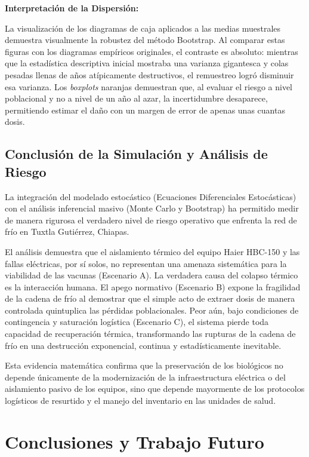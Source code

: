 \documentclass[
  spanish,
  us-letterpaper,
]{scrreprt}
\numberwithin{equation}{section}
\theoremstyle{plain}
\theoremstyle{plain}
\theoremstyle{plain}
\theoremstyle{definition}
\theoremstyle{remark}
\begin{document}
\textbf{Interpretación de la Dispersión:}

La visualización de los diagramas de caja aplicados a las medias
muestrales demuestra visualmente la robustez del método Bootstrap. Al
comparar estas figuras con los diagramas empíricos originales, el
contraste es absoluto: mientras que la estadística descriptiva inicial
mostraba una varianza gigantesca y colas pesadas llenas de años
atípicamente destructivos, el remuestreo logró disminuir esa varianza.
Los \emph{boxplots} naranjas demuestran que, al evaluar el riesgo a
nivel poblacional y no a nivel de un año al azar, la incertidumbre
desaparece, permitiendo estimar el daño con un margen de error de apenas
unas cuantas dosis.

\section{Conclusión de la Simulación y Análisis de
Riesgo}\label{conclusiuxf3n-de-la-simulaciuxf3n-y-anuxe1lisis-de-riesgo}

La integración del modelado estocástico (Ecuaciones Diferenciales
Estocásticas) con el análisis inferencial masivo (Monte Carlo y
Bootstrap) ha permitido medir de manera rigurosa el verdadero nivel de
riesgo operativo que enfrenta la red de frío en Tuxtla Gutiérrez,
Chiapas.

El análisis demuestra que el aislamiento térmico del equipo Haier
HBC-150 y las fallas eléctricas, por sí solos, no representan una
amenaza sistemática para la viabilidad de las vacunas (Escenario A). La
verdadera causa del colapso térmico es la interacción humana. El apego
normativo (Escenario B) expone la fragilidad de la cadena de frío al
demostrar que el simple acto de extraer dosis de manera controlada
quintuplica las pérdidas poblacionales. Peor aún, bajo condiciones de
contingencia y saturación logística (Escenario C), el sistema pierde
toda capacidad de recuperación térmica, transformando las rupturas de la
cadena de frío en una destrucción exponencial, continua y
estadísticamente inevitable.

Esta evidencia matemática confirma que la preservación de los biológicos
no depende únicamente de la modernización de la infraestructura
eléctrica o del aislamiento pasivo de los equipos, sino que depende
mayormente de los protocolos logísticos de resurtido y el manejo del
inventario en las unidades de salud.


\chapter{Conclusiones y Trabajo
Futuro}\label{conclusiones-y-trabajo-futuro}
\end{document}
